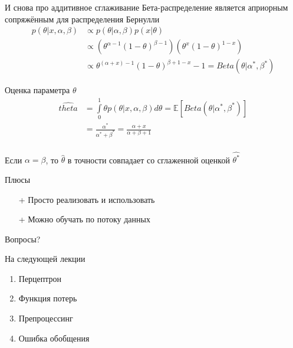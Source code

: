 \documentclass[10pt]{beamer}
\begin{document}
\begin{frame}{И снова про аддитивное сглаживание}
  Бета-распределение является априорным сопряжённым для распределения Бернулли\\  
  \begin{equation*}
    \begin{split}
    p(\theta | x, \alpha, \beta) & \propto p(\theta|\alpha, \beta) p(x|\theta) \\
      & \propto (\theta^{\alpha-1} (1-\theta)^{\beta-1})(\theta^x (1-\theta)^{1-x}) \\
      & \propto \theta^{(\alpha+x)-1} (1-\theta)^{\beta+1-x}-1 = Beta(\theta| \alpha^*, \beta^*)
    \end{split}
  \end{equation*}
\end{frame}

\begin{frame}{Оценка параметра $\theta$}
  \begin{equation*}
    \begin{split}
      \hat{theta} &= \int\limits_{0}^1 \theta p(\theta|x, \alpha, \beta) d\theta  = \mathbb{E} [Beta(\theta|\alpha^*, \beta^*)]\\
      & = \frac{\alpha^*}{\alpha^*+\beta^*} = \frac{\alpha+x}{\alpha + \beta + 1}
    \end{split}
  \end{equation*}\\
  Если $\alpha = \beta$, то $\hat{\theta}$ в точности совпадает со сглаженной оценкой $\hat{\theta^*}$  
\end{frame}

\begin{frame}{Плюсы}
  \begin{itemize} [<+->]
    \item[+] Просто реализовать и использовать
    \item[+] Можно обучать по потоку данных
  \end{itemize}
\end{frame}

\begin{frame}[standout]
  Вопросы?
\end{frame}

\appendix

\begin{frame}{На следующей лекции}
  	\begin{enumerate} [--]
		\item Перцептрон
		\item Функция потерь
		\item Препроцессинг
		\item Ошибка обобщения
	\end{enumerate}
\end{frame}
\end{document}
